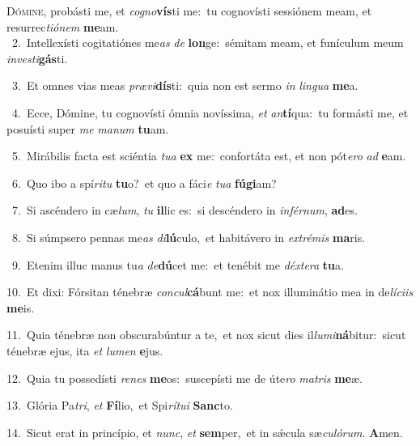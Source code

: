 \lettrine{\initial\textcolor{\initialcolor}{D}}{ómine,} probásti me, et \textit{co}\-\textit{gno}\textbf{vís}ti me:~\star tu cognovísti sessiónem meam, et resurrec\-\textit{ti}\-\textit{ó}\textit{nem} \textbf{me}\-am.\\
{\numbfont\textcolor{\numbcolor}{~2.}}~Intellexísti cogitatiónes me\textit{as} \textit{de} \textbf{lon}\-ge:~\star sémitam meam, et funículum meum \textit{in}\-\textit{ves}\textit{ti}\textbf{gás}ti.\par
{\numbfont\textcolor{\numbcolor}{~3.}}~Et omnes vias meas \textit{præ}\-\textit{vi}\textbf{dís}ti:~\star quia non est sermo \textit{in} \textit{lin}\-\textit{gua} \textbf{me}\-a.\par
{\numbfont\textcolor{\numbcolor}{~4.}}~Ecce, Dómine, tu cognovísti ómnia novíssima, \textit{et} \textit{an}\-\textbf{tí}qua:~\star tu formásti me, et posuísti super \textit{me} \textit{ma}\-\textit{num} \textbf{tu}\-am.\par
{\numbfont\textcolor{\numbcolor}{~5.}}~Mirábilis facta est sciéntia \textit{tu}\-\textit{a} \textbf{ex} me:~\star confortáta est, et non pót\-\textit{e}\-\textit{ro} \textit{ad} \textbf{e}\-am.\par
{\numbfont\textcolor{\numbcolor}{~6.}}~Quo ibo a spí\-\textit{ri}\-\textit{tu} \textbf{tu}\-o?~\star et quo a fáci\textit{e} \textit{tu}\-\textit{a} \textbf{fú}\-\textbf{gi}am?\par
{\numbfont\textcolor{\numbcolor}{~7.}}~Si ascéndero in cæ\-\textit{lum}\-, \textit{tu} \textbf{il}\-lic es:~\star si descéndero in \textit{in}\-\textit{fér}\textit{num}, \textbf{ad}\-es.\par
{\numbfont\textcolor{\numbcolor}{~8.}}~Si súmpsero pennas me\textit{as} \textit{di}\-\textbf{lú}culo,~\star et habitávero in \textit{ex}\-\textit{tré}\textit{mis} \textbf{ma}\-ris.\par
{\numbfont\textcolor{\numbcolor}{~9.}}~Etenim illuc manus tu\textit{a} \textit{de}\-\textbf{dú}cet me:~\star et tenébit me \textit{déx}\-\textit{te}\textit{ra} \textbf{tu}\-a.\par
{\numbfont\textcolor{\numbcolor}{10.}}~Et dixi: Fórsitan ténebræ \textit{con}\-\textit{cul}\textbf{cá}bunt me:~\star et nox illuminátio mea in de\-\textit{lí}\-\textit{ci}\textit{is} \textbf{me}\-is.\par
{\numbfont\textcolor{\numbcolor}{11.}}~Quia ténebræ non obscurabúntur a te,~\dagger et nox sicut dies il\-\textit{lu}\-\textit{mi}\textbf{ná}bitur:~\star sicut ténebræ ejus, ita \textit{et} \textit{lu}\-\textit{men} \textbf{e}\-jus.\par
{\numbfont\textcolor{\numbcolor}{12.}}~Quia tu possedísti \textit{re}\-\textit{nes} \textbf{me}\-os:~\star suscepísti me de úte\textit{ro} \textit{ma}\-\textit{tris} \textbf{me}\-æ.\par
{\numbfont\textcolor{\numbcolor}{13.}}~Glória Pa\-\textit{tri}\-, \textit{et} \textbf{Fí}\-lio,~\star et Spi\-\textit{rí}\-\textit{tu}\textit{i} \textbf{Sanc}\-to.\par
{\numbfont\textcolor{\numbcolor}{14.}}~Sicut erat in princípio, et \textit{nunc}\-, \textit{et} \textbf{sem}\-per,~\star et in sǽcula sæ\-\textit{cu}\-\textit{ló}\textit{rum}. \textbf{A}\-men.\par
